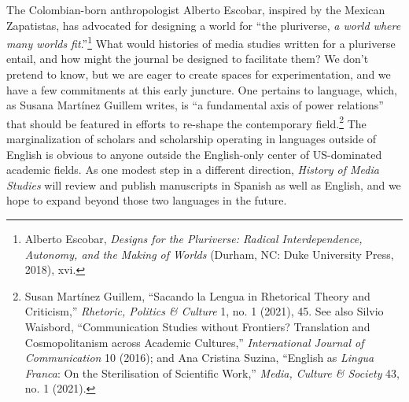 \documentclass{tufte-handout}
\begin{document}
The Colombian-born anthropologist Alberto Escobar, inspired by the
Mexican Zapatistas, has advocated for designing a world for ``the
pluriverse, \emph{a world where many worlds
fit}.''\footnote{Alberto Escobar, \emph{Designs for the Pluriverse: Radical
  Interdependence, Autonomy, and the Making of Worlds} (Durham, NC: Duke
  University Press, 2018), xvi.
} What would histories of
media studies written for a pluriverse entail, and how might the journal
be designed to facilitate them? We don't pretend to know, but we are
eager to create spaces for experimentation, and we have a few
commitments at this early juncture. One pertains to language, which, as
Susana Martínez Guillem writes, is ``a fundamental axis of power
relations'' that should be featured in efforts to re-shape the
contemporary field.\footnote{Susan Martínez Guillem, ``Sacando la Lengua in Rhetorical Theory and
  Criticism,'' \emph{Rhetoric, Politics \& Culture} 1, no. 1 (2021), 45.
  See also Silvio Waisbord, ``Communication Studies without Frontiers?
  Translation and Cosmopolitanism across Academic Cultures,''
  \emph{International Journal of Communication} 10 (2016); and Ana
  Cristina Suzina, ``English as \emph{Lingua Franca}: On the
  Sterilisation of Scientific Work,'' \emph{Media, Culture \& Society}
  43, no. 1 (2021).
} The
marginalization of scholars and scholarship operating in languages
outside of English is obvious to anyone outside the English-only center
of US-dominated academic fields. As one modest step in a different
direction, \emph{History of Media Studies} will review and publish
manuscripts in Spanish as well as English, and we hope to expand beyond
those two languages in the future.
\end{document}
